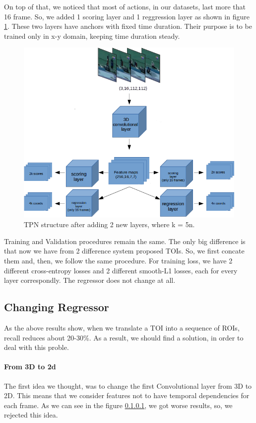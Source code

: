 \documentclass{report}
\begin{document}
On top of that, we noticed that most of actions, in our datasets, last more that 16 frame. So, we added 1 scoring layer and 1 reggression layer as shown in 
figure \ref{fig:tpn_1_2}. These two layers have anchors with fixed time duration. Their purpose is to be trained only in x-y domain, keeping time duration
steady. 
\begin{figure}[h]
  \centering
  \includegraphics[scale=0.5]{tpn_1_2}
  \caption{TPN structure after adding 2 new layers, where k = 5n.}
  \label{fig:tpn_1_2}
\end{figure}

Training and Validation procedures remain the same. The only big difference is that now we have from 2 difference system proposed TOIs. So, we first concate
them and, then, we follow the same procedure. For training loss, we have 2 different cross-entropy losses and 2 different smooth-L1 losses, each for every
layer correspondly. The regressor does not change at all.

\subsection{Changing Regressor}
As the above results show, when we translate a TOI into a sequence of ROIs, recall reduces about 20-30\%. As a result, we should find a solution, in order to
deal with this proble.
\paragraph{From 3D to 2d}
The first idea we thought, was to change the first Convolutional layer from 3D to 2D. This means that we consider  features  not to have temporal dependencies for
each frame. As we can see in the figure \ref{}, we got worse results, so, we rejected this idea.
\end{document}
